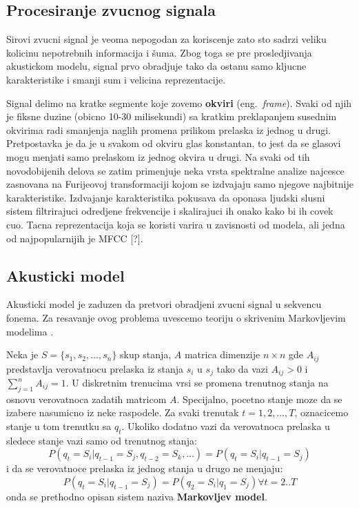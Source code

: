 \documentclass[a4paper]{article}
\begin{document}
\subsection{Procesiranje zvucnog signala}
Sirovi zvucni signal je veoma nepogodan za koriscenje zato sto sadrzi veliku kolicinu nepotrebnih informacija i šuma.
Zbog toga se pre prosledjivanja akustickom modelu, signal prvo obradjuje tako da ostanu samo kljucne karakteristike i smanji sum i velicina reprezentacije.

Signal delimo na kratke segmente koje zovemo \textbf{okviri} (eng.~{\em frame}).
Svaki od njih je fiksne duzine (obicno 10-30 milisekundi) sa kratkim preklapanjem susednim okvirima radi smanjenja naglih promena prilikom prelaska iz jednog u drugi.
Pretpostavka je da je u svakom od okviru glas konstantan, to jest da se glasovi mogu menjati samo prelaskom iz jednog okvira u drugi.
Na svaki od tih novodobijenih delova se zatim primenjuje neka vrsta spektralne analize najcesce zasnovana na Furijeovoj transformaciji kojom se izdvajaju samo njegove najbitnije karakteristike.
Izdvajanje karakteristika pokusava da oponasa ljudski slusni sistem filtrirajuci odredjene frekvencije i skalirajuci ih onako kako bi ih covek cuo.
Tacna reprezentacija koja se koristi varira u zavisnosti od modela, ali jedna od najpopularnijih je MFCC [?].

\subsection{Akusticki model}
Akusticki model je zaduzen da pretvori obradjeni zvucni signal u sekvencu fonema. 
Za resavanje ovog problema uvescemo teoriju o skrivenim Markovljevim modelima \cite{rabiner1989hmm}.

Neka je $S = \{s_1, s_2, \dots, s_n\}$ skup stanja, $A$ matrica dimenzije $n \times n$ gde $A_{ij}$ predstavlja verovatnocu prelaska iz stanja $s_i$ u $s_j$ tako da vazi $A_{ij} > 0$ i $\sum_{j=1}^{n} A_{ij} = 1$.
U diskretnim trenucima vrsi se promena trenutnog stanja na osnovu verovatnoca zadatih matricom $A$. 
Specijalno, pocetno stanje moze da se izabere nasumicno iz neke raspodele.
Za svaki trenutak $t = 1,2,\dots,T$, oznacicemo stanje u tom trenutku sa $q_t$.
Ukoliko dodatno vazi da verovatnoca prelaska u sledece stanje vazi samo od trenutnog stanja: 
$$P(q_t = S_i | q_{t-1} = S_j, q_{t-2} = S_k, \dots) = P(q_t = S_i | q_{t-1} = S_j)$$
i da se verovatnoce prelaska iz jednog stanja u drugo ne menjaju:
$$P(q_t = S_i | q_{t-1} = S_j) = P(q_2 = S_i | q_1 = S_j) \forall t=2..T$$
onda se prethodno opisan sistem naziva \textbf{Markovljev model}.
\end{document}
